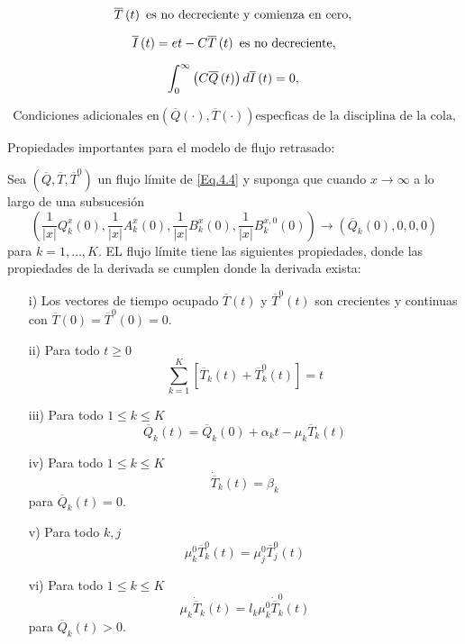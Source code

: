 \begin{Teo}
\begin{equation}\label{Eq.MF.3.3a}
\overline{T}\left(t\right)\textrm{ es no decreciente y comienza en cero},\\
\end{equation}

\begin{equation}\label{Eq.MF.4.3a}
\overline{I}\left(t\right)=et-C\overline{T}\left(t\right)\textrm{
es no decreciente,}\\
\end{equation}

\begin{equation}\label{Eq.MF.5.3a}
\int_{0}^{\infty}\left(C\overline{Q}\left(t\right)\right)d\overline{I}\left(t\right)=0,\\
\end{equation}

\begin{equation}\label{Eq.MF.6.3a}
\textrm{Condiciones adicionales en
}\left(\overline{Q}\left(\cdot\right),\overline{T}\left(\cdot\right)\right)\textrm{
especficas de la disciplina de la cola,}
\end{equation}
\end{Teo}


Propiedades importantes para el modelo de flujo retrasado:

\begin{Prop}
 Sea $\left(\overline{Q},\overline{T},\overline{T}^{0}\right)$ un flujo l\'imite de \ref{Eq.4.4} y suponga que cuando $x\rightarrow\infty$ a lo largo de
una subsucesi\'on
\[\left(\frac{1}{|x|}Q_{k}^{x}\left(0\right),\frac{1}{|x|}A_{k}^{x}\left(0\right),\frac{1}{|x|}B_{k}^{x}\left(0\right),\frac{1}{|x|}B_{k}^{x,0}\left(0\right)\right)\rightarrow\left(\overline{Q}_{k}\left(0\right),0,0,0\right)\]
para $k=1,\ldots,K$. EL flujo l\'imite tiene las siguientes
propiedades, donde las propiedades de la derivada se cumplen donde
la derivada exista:
\begin{itemize}
 \item[i)] Los vectores de tiempo ocupado $\overline{T}\left(t\right)$ y $\overline{T}^{0}\left(t\right)$ son crecientes y continuas con
$\overline{T}\left(0\right)=\overline{T}^{0}\left(0\right)=0$.
\item[ii)] Para todo $t\geq0$
\[\sum_{k=1}^{K}\left[\overline{T}_{k}\left(t\right)+\overline{T}_{k}^{0}\left(t\right)\right]=t\]
\item[iii)] Para todo $1\leq k\leq K$
\[\overline{Q}_{k}\left(t\right)=\overline{Q}_{k}\left(0\right)+\alpha_{k}t-\mu_{k}\overline{T}_{k}\left(t\right)\]
\item[iv)]  Para todo $1\leq k\leq K$
\[\dot{{\overline{T}}}_{k}\left(t\right)=\beta_{k}\] para $\overline{Q}_{k}\left(t\right)=0$.
\item[v)] Para todo $k,j$
\[\mu_{k}^{0}\overline{T}_{k}^{0}\left(t\right)=\mu_{j}^{0}\overline{T}_{j}^{0}\left(t\right)\]
\item[vi)]  Para todo $1\leq k\leq K$
\[\mu_{k}\dot{{\overline{T}}}_{k}\left(t\right)=l_{k}\mu_{k}^{0}\dot{{\overline{T}}}_{k}^{0}\left(t\right)\] para $\overline{Q}_{k}\left(t\right)>0$.
\end{itemize}
\end{Prop}

